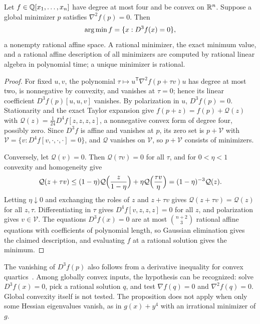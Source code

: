 \begin{proposition}
\label{prop:bnd-zero-hessian}
Let $f\in\mathbb Q[x_1,\ldots,x_n]$ have degree at most four and be convex on $\mathbb R^n$.
Suppose a global minimizer $p$ satisfies $\nabla^2f(p)=0$. Then
\[
\operatorname*{arg\,min} f=\{x:D^3f(x)=0\},
\]
a nonempty rational affine space. A rational minimizer, the exact minimum
value, and a rational affine description of all minimizers are computed by
rational linear algebra in polynomial time; a unique minimizer is rational.
\end{proposition}

\begin{proof}
For fixed $u,v$, the polynomial $\tau\mapsto u^{\mathsf T}\nabla^2f(p+\tau
v)u$ has degree at most two, is nonnegative by convexity, and vanishes at
$\tau=0$; hence its linear coefficient $D^3f(p)[u,u,v]$ vanishes. By
polarization in $u$, $D^3f(p)=0$. Stationarity and the exact Taylor expansion
give $f(p+z)=f(p)+\mathcal Q(z)$ with $\mathcal Q(z)=\tfrac1{24}D^4f[z,z,z,z]$,
a nonnegative convex form of degree four, possibly zero. Since $D^3f$ is
affine and vanishes at $p$, its zero set is $p+\mathcal V$ with
$\mathcal V=\{v:D^4f[v,\cdot,\cdot,\cdot]=0\}$, and $\mathcal Q$ vanishes on
$\mathcal V$, so $p+\mathcal V$ consists of minimizers.

Conversely, let $\mathcal Q(v)=0$. Then $\mathcal Q(\tau v)=0$ for all $\tau$,
and for $0<\eta<1$ convexity and homogeneity give
\[
\mathcal Q(z+\tau v)\le(1-\eta)\mathcal Q\Bigl(\frac z{1-\eta}\Bigr)
+\eta\mathcal Q\Bigl(\frac{\tau v}\eta\Bigr)=(1-\eta)^{-3}\mathcal Q(z).
\]
Letting $\eta\downarrow0$ and exchanging the roles of $z$ and $z+\tau v$ gives
$\mathcal Q(z+\tau v)=\mathcal Q(z)$ for all $z,\tau$. Differentiating in
$\tau$ gives $D^4f[v,z,z,z]=0$ for all $z$, and polarization gives
$v\in\mathcal V$. The equations $D^3f(x)=0$ are at most $\binom{n+2}3$ rational
affine equations with coefficients of polynomial length, so Gaussian
elimination gives the claimed description, and evaluating $f$ at a rational
solution gives the minimum.
\end{proof}

The vanishing of $D^3f(p)$ also follows from a derivative inequality for
convex quartics~\cite{Nesterov2025}. Among globally convex inputs, the
hypothesis can be recognized: solve
$D^3f(x)=0$, pick a rational solution $q$, and test $\nabla f(q)=0$ and
$\nabla^2f(q)=0$. Global convexity itself is not tested. The proposition does
not apply when only some Hessian eigenvalues vanish, as in $g(x)+y^4$ with
an irrational minimizer of $g$.

